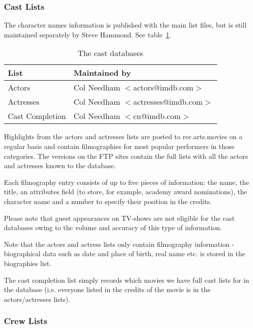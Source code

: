 \subsubsection{Cast Lists}

The character names information is published with the main list files,
but is still maintained separately by Steve Hammond. See 
table~\ref{tbl:cast}.

\begin{table}
\begin{center}
{\small
\begin{tabular}{|l|l|} \hline
List  & Maintained by  \\ \hline
Actors               & Col Needham $<$actors@imdb.com$>$ \\ \hline
Actresses            & Col Needham $<$actresses@imdb.com$>$ \\ \hline
Cast Completion      & Col Needham $<$cn@imdb.com$>$ \\ \hline
\end{tabular}}
\caption{\label{tbl:cast} The cast databases}
\end{center}
\end{table}

Highlights from the actors and actresses lists are posted to 
rec.arts.movies on
a regular basis and contain filmographies for most popular performers in
those categories. The versions on the FTP sites contain the full lists with
all the actors and actresses known to the database.

Each filmography entry consists of up to five pieces of information: the 
name, the title, an attributes field (to store, for example, academy award 
nominations), the character name and a number to specify their position in
the credits.

Please note that guest appearances on TV-shows are not eligible for the 
cast
databases owing to the volume and accuracy of this type of information.

Note that the actors and actress lists only contain filmography 
information -
biographical data such as date and place of birth, real name etc. is stored
in the biographies list.

The cast completion list simply records which movies we have full cast lists
for in the database (i.e. everyone listed in the credits of the movie is in
the actors/actresses lists).

\subsubsection{Crew Lists}

